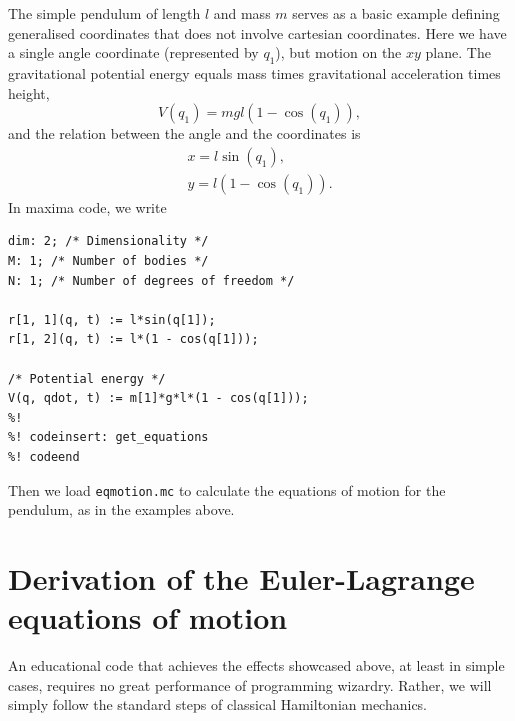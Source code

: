 \documentclass{article}
\begin{document}
The simple pendulum of length $l$ and mass $m$ serves as a basic example
defining generalised coordinates that does not involve cartesian coordinates.
Here we have a single angle coordinate (represented by $q_1$), but motion on the
$xy$ plane. The gravitational potential energy equals mass times gravitational
acceleration times height,
\begin{equation*}
  V(q_1) = m g l(1 - \cos(q_1)),
\end{equation*}
and the relation between the angle and the coordinates is
\begin{align*}
  x = l \sin(q_1), \\
  y = l (1 - \cos(q_1)).
\end{align*}
In maxima code, we write
\begin{lstlisting}[frame=single]
%! codefile: pendulum.mc
dim: 2; /* Dimensionality */
M: 1; /* Number of bodies */
N: 1; /* Number of degrees of freedom */

r[1, 1](q, t) := l*sin(q[1]);
r[1, 2](q, t) := l*(1 - cos(q[1]));

/* Potential energy */
V(q, qdot, t) := m[1]*g*l*(1 - cos(q[1]));
%!
%! codeinsert: get_equations
%! codeend
\end{lstlisting}
Then we load \texttt{eqmotion.mc} to calculate the equations of motion
for the pendulum, as in the examples above.

\section{\label{Euler-Lagrange_equations}Derivation of the Euler-Lagrange 
equations of motion}

An educational code that achieves the effects showcased above, at least in
simple cases, requires no great performance of programming wizardry. Rather, we
will simply follow the standard steps of classical Hamiltonian mechanics.
\end{document}
